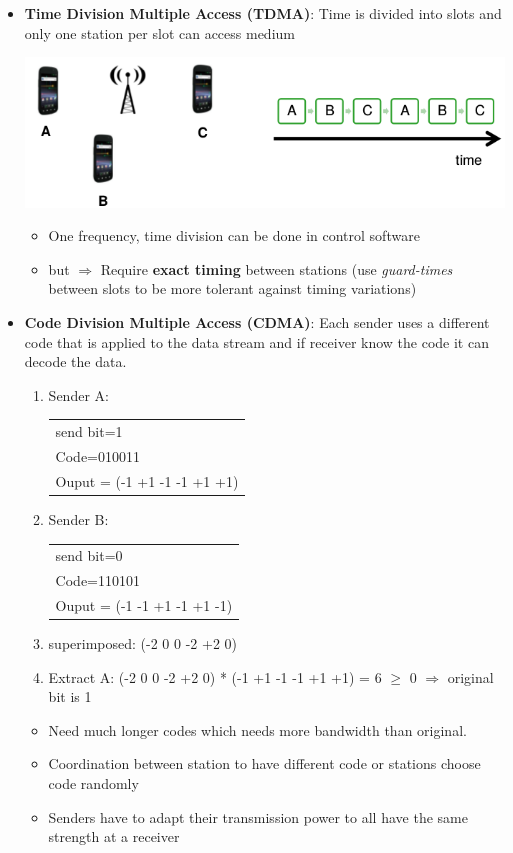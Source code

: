 \begin{itemize}
    \item \textbf{Time Division Multiple Access (TDMA)}:
        Time is divided into slots and only one station per slot can
        access medium
        \begin{center}
            \includegraphics[width=0.6\linewidth]{img/TDMA.png}
        \end{center}

        \begin{itemize}
            \item One frequency, time division can be done in
                control software 
            \item but $\Rightarrow$ Require \textbf{exact timing} between stations
                (use \textit{guard-times} between slots to be more tolerant
                against timing variations)
        \end{itemize}

    \item \textbf{Code Division Multiple Access (CDMA)}: Each sender
        uses a different code that is applied to the data stream and if
        receiver know the code it can decode the data.

        \begin{enumerate}
            \item Sender A: \begin{tabular}{l} send bit=1\\
                Code=010011\\ Ouput = (-1 +1 -1 -1 +1 +1)\end{tabular}
            \item Sender B: \begin{tabular}{l} send bit=0\\
                Code=110101\\ Ouput = (-1 -1 +1 -1 +1 -1)\end{tabular}
            \item superimposed: (-2 0 0 -2 +2 0)
            \item Extract A: (-2 0 0 -2 +2 0) * (-1 +1 -1 -1 +1 +1) = 6
                $\geq$ 0 $\Rightarrow$ original bit is 1
        \end{enumerate}

        \begin{itemize}
            \item Need much longer codes which needs more bandwidth than
                original. 
            \item Coordination between station to have different code or
                stations choose code randomly
            \item Senders have to adapt their transmission power to all have
                the same strength at a receiver
        \end{itemize}
\end{itemize}

